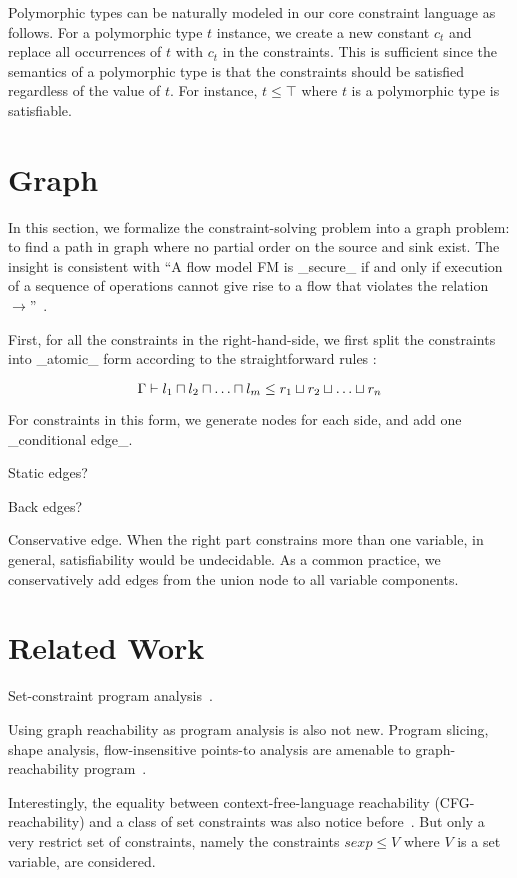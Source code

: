 Polymorphic types can be naturally modeled in our core constraint
language as follows. For a polymorphic type $t$ instance, we create a
new constant $c_t$ and replace all occurrences of $t$ with $c_t$ in
the constraints. This is sufficient since the semantics of a
polymorphic type is that the constraints should be satisfied
regardless of the value of $t$. For instance, $t\leq \top$ where $t$
is a polymorphic type is satisfiable.

\section{Graph} 

In this section, we formalize the constraint-solving problem into a
graph problem: to find a path in graph where no partial order on the
source and sink exist. The insight is consistent with ``A flow model
FM is _secure_ if and only if execution of a sequence of operations
cannot give rise to a flow that violates the relation
$\rightarrow$''~\cite{denning-lattice}.

First, for all the constraints in the right-hand-side, we
first split the constraints into _atomic_ form according to the
straightforward rules :

\[
\G \proves l_1 \meet l_2 \meet \dots \meet l_m \leq r_1 \join r_2 \join \dots
\join r_n
\]

For constraints in this form, we generate nodes for each side, and
add one _conditional edge_.

Static edges?

Back edges?

 Conservative edge. When the right part constrains more
than one variable, in general, satisfiability would be undecidable. As
a common practice, we conservatively add edges from the
union node to all variable components.

\section{Related Work}

Set-constraint program analysis~\cite{aiken-setconstraint}.

Using graph reachability as program analysis is also not
new. Program slicing, shape analysis, flow-insensitive points-to
analysis are amenable to graph-reachability program~\cite{reps-graph}.

Interestingly, the equality between context-free-language reachability
(CFG-reachability) and a class of set constraints was also notice
before~\cite{melski-cflgraph}. But only a very restrict set of
constraints, namely the constraints $sexp \leq V$ where $V$ is a
set variable, are considered.

